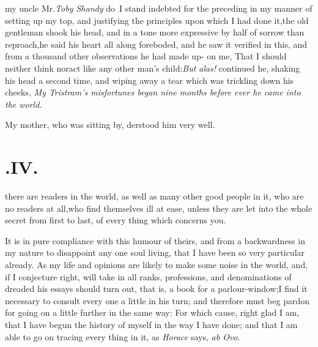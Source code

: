 \documentclass{article}
\begin{document}
 my uncle Mr.\@ \textit{Toby Shandy} do~I\break
stand indebted for the preceding\break
{}
\break
in my manner of
setting up my top, and justifying the principles upon which I had
done it,\tsk the old gentleman shook his head, and in a tone more
expressive by half of sorrow than reproach,\tsk he said his heart
all along foreboded, and he saw it verified in this, and from a
thousand other observations he had made up- on me, That I should
neither think nor\break act like any other man’s
child:\tsh \textit{But} \textit{alas!} continued he, shaking his head a
second time, and wiping away a tear which was trickling down his
cheeks, \textit{My Tristram’s misfortunes began nine months before
ever he came into the world.}

\tsh My mother, who was sitting by,\break
{}
derstood him very well.

\null
\section{.\enspace IV.}

 there are readers in the
world, as well as many other good people in it, who are no readers
at all,\tsk who find themselves ill at ease, unless they are let
into the whole secret from first to last, of every thing which
concerns you.

It is in pure compliance with this humour of theirs, and from a
backwardness in my nature to disappoint any one soul living, that I
have been so very particular already. As my life and opinions are
likely to make some noise in the world, and, if I conjecture right,
will take in all ranks, professions, and denominations of 
dreaded his essays should turn out, that is,
a book for a parlour-window;\tsk I find it necessary to consult
every one a little in his turn; and therefore must beg pardon for going on a little
further in the same way:
For which cause, right glad I am, that I have begun the history of
myself in the way I have done; and that I am able to go on tracing
every thing in it, as \textit{Horace} says, \textit{ab Ovo}.
\end{document}
